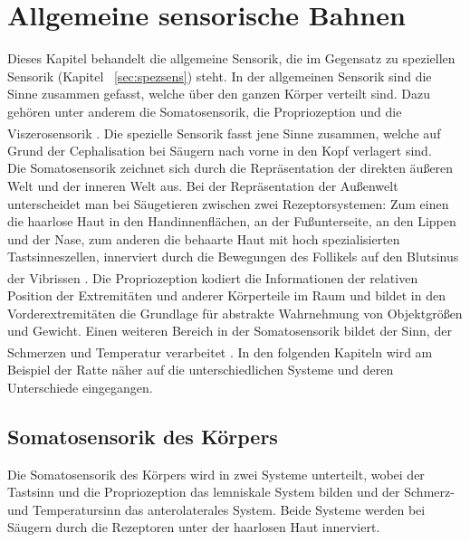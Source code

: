 \documentclass[12pt,a4paper,pdftex]{article}
\begin{document}


\newpage
\section{Allgemeine sensorische Bahnen} \label{sec:sensorische_Bahnen}
Dieses Kapitel behandelt die allgemeine Sensorik,  die im Gegensatz zu speziellen Sensorik (Kapitel~ \ref{sec:spezsens}) steht. In der allgemeinen Sensorik sind die Sinne zusammen gefasst, welche über den ganzen Körper verteilt sind. Dazu gehören unter anderem die Somatosensorik, die Propriozeption und die Viszerosensorik  \textsuperscript{\cite[22]{kandel2013principles}}. Die spezielle Sensorik  fasst jene Sinne zusammen, welche auf Grund der Cephalisation bei Säugern nach vorne in den Kopf verlagert sind.
\\
\noindent
Die Somatosensorik zeichnet sich durch die Repräsentation der direkten äußeren Welt und der inneren Welt aus. Bei der Repräsentation der Außenwelt unterscheidet man bei Säugetieren zwischen zwei Rezeptorsystemen: Zum einen die haarlose Haut in den Handinnenflächen, an der Fußunterseite, an den Lippen und der Nase, zum anderen die behaarte Haut mit hoch spezialisierten Tastsinneszellen, innerviert durch die Bewegungen des Follikels auf den Blutsinus  der Vibrissen  \textsuperscript{\cite[24]{paxinos2014rat}}.
Die Propriozeption kodiert die Informationen der relativen Position der Extremitäten und anderer Körperteile im Raum und bildet in den Vorderextremitäten die Grundlage für abstrakte Wahrnehmung von Objektgrößen und Gewicht. Einen weiteren Bereich in der Somatosensorik bildet der Sinn, der Schmerzen und Temperatur verarbeitet \textsuperscript{\cite[24]{paxinos2014rat}}.
In den folgenden Kapiteln wird am Beispiel der Ratte näher auf die unterschiedlichen Systeme und deren Unterschiede eingegangen.


\subsection{Somatosensorik  des Körpers}
Die Somatosensorik des Körpers wird in zwei Systeme unterteilt, wobei der Tastsinn  und die Propriozeption das lemniskale System  bilden und der Schmerz- und Temperatursinn das anterolaterales System.  Beide Systeme werden bei Säugern durch die Rezeptoren unter der haarlosen Haut innerviert.
\end{document}
